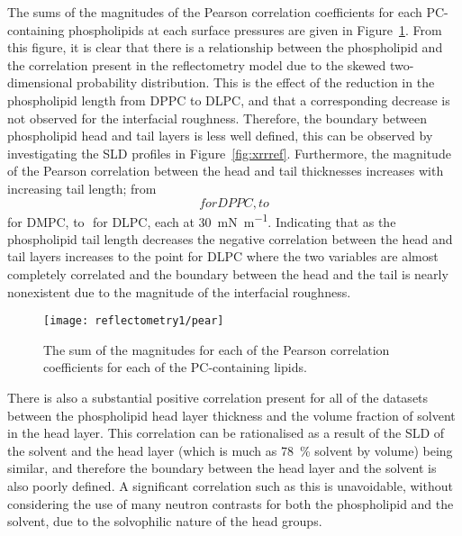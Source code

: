 The sums of the magnitudes of the Pearson correlation coefficients for each PC-containing phospholipids at each surface pressures are given in Figure~\ref{fig:pear}.
From this figure, it is clear that there is a relationship between the phospholipid and the correlation present in the reflectometry model due to the skewed two-dimensional probability distribution.
This is the effect of the reduction in the phospholipid length from DPPC to DLPC, and that a corresponding decrease is not observed for the interfacial roughness.
Therefore, the boundary between phospholipid head and tail layers is less well defined, this can be observed by investigating the SLD profiles in Figure~\ref{fig:xrrref}.
Furthermore, the magnitude of the Pearson correlation between the head and tail thicknesses increases with increasing tail length; from $$ for DPPC, to $$ for DMPC, to $$ for DLPC, each at \SI{30}{\milli\newton\per\meter}.
Indicating that as the phospholipid tail length decreases the negative correlation between the head and tail layers increases to the point for DLPC where the two variables are almost completely correlated and the boundary between the head and the tail is nearly nonexistent due to the magnitude of the interfacial roughness.
%
\begin{figure}
    \centering
    \texttt{[image: reflectometry1/pear]}
    \caption{The sum of the magnitudes for each of the Pearson correlation coefficients for each of the PC-containing lipids.}
    \label{fig:pear}
\end{figure}
%

There is also a substantial positive correlation present for all of the datasets between the phospholipid head layer thickness and the volume fraction of solvent in the head layer.
This correlation can be rationalised as a result of the SLD of the solvent and the head layer (which is much as \SI{78}{\percent} solvent by volume) being similar, and therefore the boundary between the head layer and the solvent is also poorly defined.
A significant correlation such as this is unavoidable, without considering the use of many neutron contrasts for both the phospholipid and the solvent, due to the solvophilic nature of the head groups.
